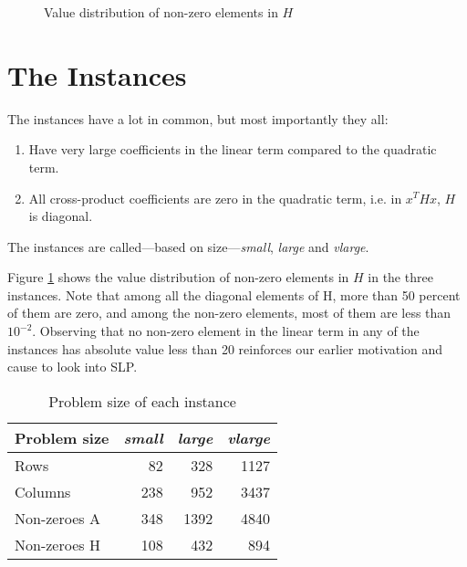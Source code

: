 \begin{figure}[h!]
\begin{center}

\end{center}
\caption{Value distribution of non-zero elements in $H$}
\label{fig:histH}
\end{figure}

\section{The Instances}
\label{sec:instances}
The instances have a lot in common, but most importantly they all:
\begin{enumerate}
\item Have very large coefficients in the linear term compared to the
quadratic term.
\item All cross-product coefficients are zero in the quadratic term, i.e. in
$x^T H x$, $H$ is diagonal.
\end{enumerate}

The instances are called---based on size---\textit{small}, \textit{large}
and \textit{vlarge}.

Figure \ref{fig:histH} shows the value distribution of non-zero elements in $H$
in the three instances. Note that among all the diagonal elements of H, more
than 50 percent of them are zero, and among the non-zero elements, most of them
are less than $10^{-2}$.
Observing that no non-zero element in the linear term in any of the instances
has absolute value less than 20 reinforces our earlier motivation and
cause to look into SLP.

\begin{table}
    \centering
    \caption{Problem size of each instance}
    \begin{tabular}{lrrr}
    Problem size & \textit{small} & \textit{large} & \textit{vlarge} \\\hline
    Rows         & 82             & 328            & 1127 \\
    Columns      & 238            & 952            & 3437 \\
    Non-zeroes A & 348            & 1392           & 4840 \\
    Non-zeroes H & 108            & 432            & 894 \\
    \end{tabular}
    \label{table:sizes}
\end{table}


